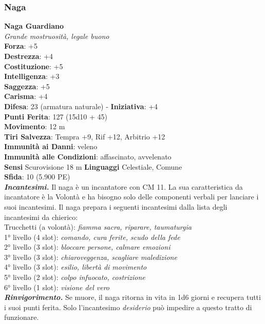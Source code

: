 \begin{multicols}{2}
\subsubsection{Naga}

\medskip\textbf{Naga Guardiano}\\
\emph{Grande mostruosità, legale buono}\\
\textbf{Forza}: +5\\
\textbf{Destrezza}: +4\\
\textbf{Costituzione}: +5\\
\textbf{Intelligenza}: +3\\
\textbf{Saggezza}: +5\\
\textbf{Carisma}: +4\\
\textbf{Difesa}: 23 (armatura naturale) - \textbf{Iniziativa}: +4\\
\textbf{Punti Ferita}: 127 (15d10 + 45)\\
\textbf{Movimento}: 12 m\\
\textbf{Tiri Salvezza}: Tempra +9, Rif +12, Arbitrio +12\\
\textbf{Immunità ai Danni}: veleno\\
\textbf{Immunità alle Condizioni}: affascinato, avvelenato\\
\textbf{Sensi} Scurovisione 18 m \textbf{Linguaggi} Celestiale, Comune\\
\textbf{Sfida}: 10 (5.900 PE)\smallskip\\
\emph{\textbf{Incantesimi.}} Il naga è un incantatore con CM 11. La sua caratteristica da incantatore è la Volontà e ha bisogno solo delle componenti verbali per lanciare i suoi incantesimi. Il naga prepara i seguenti incantesimi dalla lista degli incantesimi da chierico:\\
Trucchetti (a volontà): \emph{fiamma sacra, riparare, taumaturgia}\\
1° livello (4 slot): \emph{comando, cura ferite, scudo della fede}\\
2° livello (3 slot): \emph{bloccare persone, calmare emozioni}\\
3° livello (3 slot): \emph{chiaroveggenza, scagliare maledizione}\\
4° livello (3 slot): \emph{esilio, libertà di movimento}\\
5° livello (2 slot): \emph{colpo infuocato, costrizione}\\
6° livello (1 slot): \emph{visione del vero}\\
\emph{\textbf{Rinvigorimento.}} Se muore, il naga ritorna in vita in 1d6 giorni e recupera tutti i suoi punti ferita. Solo l'incantesimo \emph{desiderio} può impedire a questo tratto di funzionare.\\

\end{multicols}
